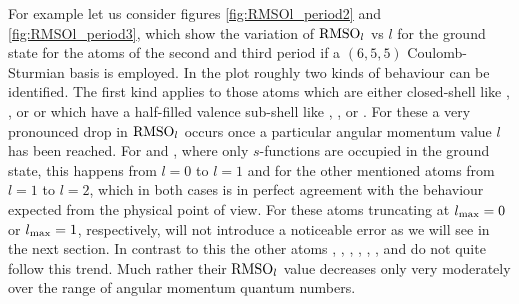 For example let us consider figures \ref{fig:RMSOl_period2}
and \vref{fig:RMSOl_period3},
which show the variation of $\text{RMSO}_l$ vs $l$ for the \HF ground state
for the atoms of the second and third period
if a $(6,5,5)$ Coulomb-Sturmian basis is employed.
In the plot roughly two kinds of behaviour can be identified.
The first kind applies to those atoms which are either closed-shell
like , ,  or 
or which have a half-filled valence sub-shell
like , ,  or .
For these a very pronounced drop in $\text{RMSO}_l$ occurs once a particular
angular momentum value $l$ has been reached.
For  and , where only $s$-functions are occupied in the ground state,
this happens from $l=0$ to $l=1$
and for the other mentioned atoms from $l=1$ to $l=2$,
which in both cases is in perfect agreement with the behaviour expected
from the physical point of view.
For these atoms truncating at $l_\text{max} = 0$ or $l_\text{max}=1$, respectively,
will not introduce a noticeable error as we will see in the next section.
In contrast to this the other atoms
, , , , , ,  and 
do not quite follow this trend.
Much rather their $\text{RMSO}_l$ value decreases only very moderately over the range
of angular momentum quantum numbers.

